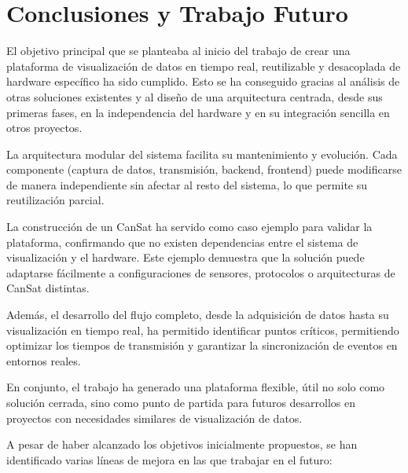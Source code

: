 \chapter{Conclusiones y Trabajo Futuro}
\label{cap:conclusiones}

El objetivo principal que se planteaba al inicio del trabajo de crear una plataforma de visualización de datos en tiempo real, reutilizable y desacoplada de hardware específico ha sido cumplido.
Esto se ha conseguido gracias al análisis de otras soluciones existentes y al diseño de una arquitectura centrada, desde sus primeras fases, en la independencia del hardware y en su integración sencilla en otros proyectos.

La arquitectura modular del sistema facilita su mantenimiento y evolución.
Cada componente (captura de datos, transmisión, backend, frontend) puede modificarse de manera independiente sin afectar al resto del sistema, lo que permite su reutilización parcial.

La construcción de un CanSat ha servido como caso ejemplo para validar la plataforma, confirmando que no existen dependencias entre el sistema de visualización y el hardware.
Este ejemplo demuestra que la solución puede adaptarse fácilmente a configuraciones de sensores, protocolos o arquitecturas de CanSat distintas.

Además, el desarrollo del flujo completo, desde la adquisición de datos hasta su visualización en tiempo real, ha permitido identificar puntos críticos,
permitiendo optimizar los tiempos de transmisión y garantizar la sincronización de eventos en entornos reales.

En conjunto, el trabajo ha generado una plataforma flexible, útil no solo como solución cerrada,
sino como punto de partida para futuros desarrollos en proyectos con necesidades similares de visualización de datos.

A pesar de haber alcanzado los objetivos inicialmente propuestos, se han identificado
varias líneas de mejora en las que trabajar en el futuro:

